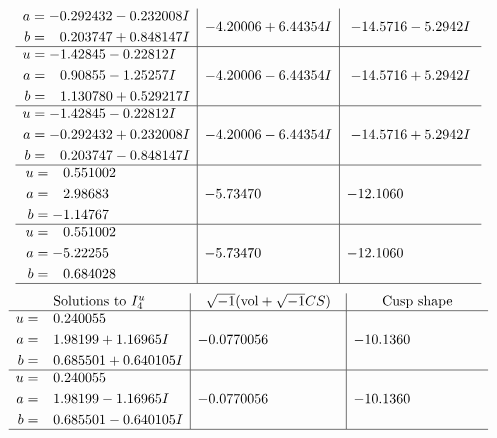\documentclass[1p]{elsarticle_modified}
\theoremstyle{definition}
\newcommand{\I}{\sqrt{-1}}
\begin{document}
$$\begin{array}{c|c|c}
\begin{aligned}
a &= -0.292432 - 0.232008 I \\
b &= \phantom{-}0.203747 + 0.848147 I\end{aligned}
 & -4.20006 + 6.44354 I & -14.5716 - 5.2942 I \\ \hline\begin{aligned}
u &= -1.42845 - 0.22812 I \\
a &= \phantom{-}0.90855 - 1.25257 I \\
b &= \phantom{-}1.130780 + 0.529217 I\end{aligned}
 & -4.20006 - 6.44354 I & -14.5716 + 5.2942 I \\ \hline\begin{aligned}
u &= -1.42845 - 0.22812 I \\
a &= -0.292432 + 0.232008 I \\
b &= \phantom{-}0.203747 - 0.848147 I\end{aligned}
 & -4.20006 - 6.44354 I & -14.5716 + 5.2942 I \\ \hline\begin{aligned}
u &= \phantom{-}0.551002\phantom{ +0.000000I} \\
a &= \phantom{-}2.98683\phantom{ +0.000000I} \\
b &= -1.14767\phantom{ +0.000000I}\end{aligned}
 & -5.73470\phantom{ +0.000000I} & -12.1060\phantom{ +0.000000I} \\ \hline\begin{aligned}
u &= \phantom{-}0.551002\phantom{ +0.000000I} \\
a &= -5.22255\phantom{ +0.000000I} \\
b &= \phantom{-}0.684028\phantom{ +0.000000I}\end{aligned}
 & -5.73470\phantom{ +0.000000I} & -12.1060\phantom{ +0.000000I}\\
 \hline 
 \end{array}$$\newpage$$\begin{array}{c|c|c}  
\text{Solutions to }I^u_{4}& \I (\text{vol} + \sqrt{-1}CS) & \text{Cusp shape}\\
 \hline 
\begin{aligned}
u &= \phantom{-}0.240055\phantom{ +0.000000I} \\
a &= \phantom{-}1.98199 + 1.16965 I \\
b &= \phantom{-}0.685501 + 0.640105 I\end{aligned}
 & -0.0770056\phantom{ +0.000000I} & -10.1360\phantom{ +0.000000I} \\ \hline\begin{aligned}
u &= \phantom{-}0.240055\phantom{ +0.000000I} \\
a &= \phantom{-}1.98199 - 1.16965 I \\
b &= \phantom{-}0.685501 - 0.640105 I\end{aligned}
 & -0.0770056\phantom{ +0.000000I} & -10.1360\phantom{ +0.000000I}\\
 \hline 
 \end{array}$$\newpage\newpage\renewcommand{\arraystretch}{1}
\end{document}
